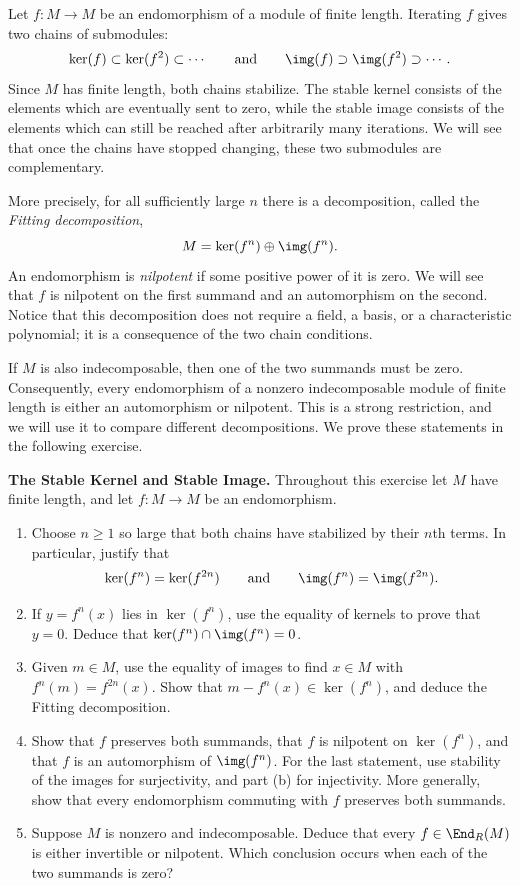 \documentclass[12pt,reqno]{amsart}
\begin{document}
\hrulefill

Let $f:M\to M$ be an endomorphism of a module of finite length. Iterating $f$ gives two chains of submodules:
\[
\ker(f)\subset\ker(f^2)\subset\cdots\qquad\text{and}\qquad\img(f)\supset\img(f^2)\supset\cdots.
\]
Since $M$ has finite length, both chains stabilize. The stable kernel consists of the elements which are eventually sent to zero, while the stable image consists of the elements which can still be reached after arbitrarily many iterations. We will see that once the chains have stopped changing, these two submodules are complementary.

More precisely, for all sufficiently large $n$ there is a decomposition, called the \emph{Fitting decomposition},
\[
M=\ker(f^n)\oplus\img(f^n).
\]
An endomorphism is \emph{nilpotent} if some positive power of it is zero. We will see that $f$ is nilpotent on the first summand and an automorphism on the second. Notice that this decomposition does not require a field, a basis, or a characteristic polynomial; it is a consequence of the two chain conditions.

If $M$ is also indecomposable, then one of the two summands must be zero. Consequently, every endomorphism of a nonzero indecomposable module of finite length is either an automorphism or nilpotent. This is a strong restriction, and we will use it to compare different decompositions. We prove these statements in the following exercise.

\hrulefill

\begin{problems}
\item\label{c:fitting} \textbf{The Stable Kernel and Stable Image.} Throughout this exercise let $M$ have finite length, and let $f:M\to M$ be an endomorphism.
\begin{enumerate}
\item Choose $n\geq1$ so large that both chains have stabilized by their $n$th terms. In particular, justify that
\[
\ker(f^n)=\ker(f^{2n})\qquad\text{and}\qquad\img(f^n)=\img(f^{2n}).
\]
\item If $y=f^n(x)$ lies in $\ker(f^n)$, use the equality of kernels to prove that $y=0$. Deduce that $\ker(f^n)\cap\img(f^n)=0$.
\item Given $m\in M$, use the equality of images to find $x\in M$ with $f^n(m)=f^{2n}(x)$. Show that $m-f^n(x)\in\ker(f^n)$, and deduce the Fitting decomposition.
\item Show that $f$ preserves both summands, that $f$ is nilpotent on $\ker(f^n)$, and that $f$ is an automorphism of $\img(f^n)$. For the last statement, use stability of the images for surjectivity, and part (b) for injectivity. More generally, show that every endomorphism commuting with $f$ preserves both summands.
\item Suppose $M$ is nonzero and indecomposable. Deduce that every $f\in\End_R(M)$ is either invertible or nilpotent. Which conclusion occurs when each of the two summands is zero?
\end{enumerate}
\end{problems}
\end{document}
